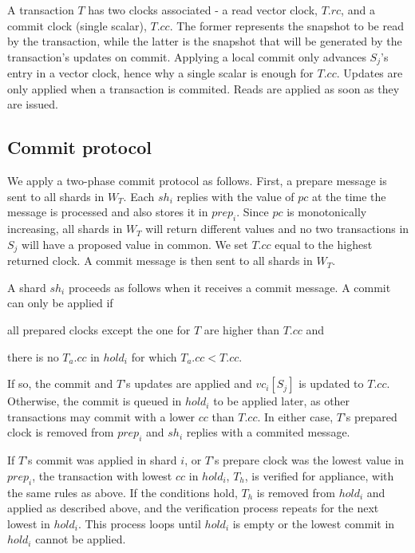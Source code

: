 \documentclass{vldb}
\begin{document}
A transaction $T$ has two clocks associated - a read vector clock, $T.rc$, and a commit clock (single scalar), $T.cc$.
The former represents the snapshot to be read by the transaction, while the latter is the snapshot that will be generated by the transaction's updates on commit.
Applying a local commit only advances $S_j$'s entry in a vector clock, hence why a single scalar is enough for $T.cc$.
Updates are only applied when a transaction is commited. 
Reads are applied as soon as they are issued. %


\subsection{Commit protocol}
We apply a two-phase commit protocol as follows.
First, a prepare message is sent to all shards in $W_T$.
Each $sh_i$ replies with the value of $pc$ at the time the message is processed and also stores it in $prep_i$. %
Since $pc$ is monotonically increasing, all shards in $W_T$ will return different values and no two transactions in $S_j$ will have a proposed value in common.
We set $T.cc$ equal to the highest returned clock.
A commit message is then sent to all shards in $W_T$.	%

A shard $sh_i$ proceeds as follows when it receives a commit message.
A commit can only be applied if
\begin{enumerate*}[label=(\roman*)] 
	\item all prepared clocks except the one for $T$ are higher than $T.cc$ and
	\item there is no $T_a.cc$ in $hold_i$ for which $T_a.cc < T.cc$.
\end{enumerate*}
If so, the commit and $T$'s updates are applied and $vc_i[S_j]$ is updated to $T.cc$.
Otherwise, the commit is queued in $hold_i$ to be applied later, as other transactions may commit with a lower $cc$ than $T.cc$.
In either case, $T$'s prepared clock is removed from $prep_i$ and $sh_i$ replies with a commited message.

If $T$'s commit was applied in shard $i$, or $T$'s prepare clock was the lowest value in $prep_i$, the transaction with lowest $cc$ in $hold_i$, $T_h$, is verified for appliance, with the same rules as above.
If the conditions hold, $T_h$ is removed from $hold_i$ and applied as described above, and the verification process repeats for the next lowest in $hold_i$.
This process loops until $hold_i$ is empty or the lowest commit in $hold_i$ cannot be applied. %
\end{document}
